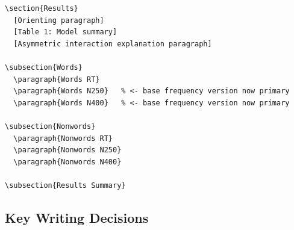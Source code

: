 \documentclass[11pt, a4paper]{article}
\begin{document}
\begin{lstlisting}[language={}, style=Rstyle, basicstyle=\ttfamily\small]
\section{Results}
  [Orienting paragraph]
  [Table 1: Model summary]
  [Asymmetric interaction explanation paragraph]

\subsection{Words}
  \paragraph{Words RT}
  \paragraph{Words N250}   % <- base frequency version now primary
  \paragraph{Words N400}   % <- base frequency version now primary

\subsection{Nonwords}
  \paragraph{Nonwords RT}
  \paragraph{Nonwords N250}
  \paragraph{Nonwords N400}

\subsection{Results Summary}
\end{lstlisting}

\subsection{Key Writing Decisions}
\end{document}
